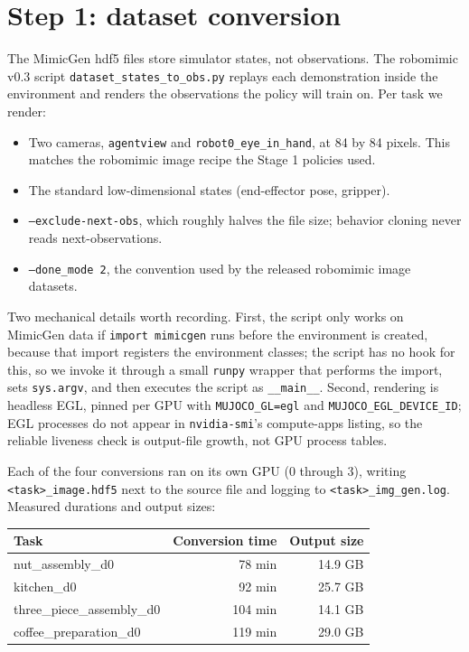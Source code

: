 \documentclass[11pt]{article}
\begin{document}
\section{Step 1: dataset conversion}
\label{sec:convert}

The MimicGen hdf5 files store simulator states, not observations. The robomimic
v0.3 script \texttt{dataset\_states\_to\_obs.py} replays each demonstration
inside the environment and renders the observations the policy will train on.
Per task we render:

\begin{itemize}[leftmargin=2em]
  \item Two cameras, \texttt{agentview} and \texttt{robot0\_eye\_in\_hand}, at
        84 by 84 pixels. This matches the robomimic image recipe the Stage 1
        policies used.
  \item The standard low-dimensional states (end-effector pose, gripper).
  \item \texttt{--exclude-next-obs}, which roughly halves the file size;
        behavior cloning never reads next-observations.
  \item \texttt{--done\_mode 2}, the convention used by the released robomimic
        image datasets.
\end{itemize}

Two mechanical details worth recording. First, the script only works on
MimicGen data if \texttt{import mimicgen} runs before the environment is
created, because that import registers the environment classes; the script has
no hook for this, so we invoke it through a small \texttt{runpy} wrapper that
performs the import, sets \texttt{sys.argv}, and then executes the script as
\texttt{\_\_main\_\_}. Second, rendering is headless EGL, pinned per GPU with
\texttt{MUJOCO\_GL=egl} and \texttt{MUJOCO\_EGL\_DEVICE\_ID}; EGL processes do
not appear in \texttt{nvidia-smi}'s compute-apps listing, so the reliable
liveness check is output-file growth, not GPU process tables.

Each of the four conversions ran on its own GPU (0 through 3), writing
\texttt{<task>\_image.hdf5} next to the source file and logging to
\texttt{<task>\_img\_gen.log}. Measured durations and output sizes:

\begin{center}
\small
\begin{tabular}{@{}lrr@{}}
\toprule
Task & Conversion time & Output size \\
\midrule
nut\_assembly\_d0          & 78 min  & 14.9 GB \\
kitchen\_d0                & 92 min  & 25.7 GB \\
three\_piece\_assembly\_d0 & 104 min & 14.1 GB \\
coffee\_preparation\_d0    & 119 min & 29.0 GB \\
\bottomrule
\end{tabular}
\end{center}
\end{document}
